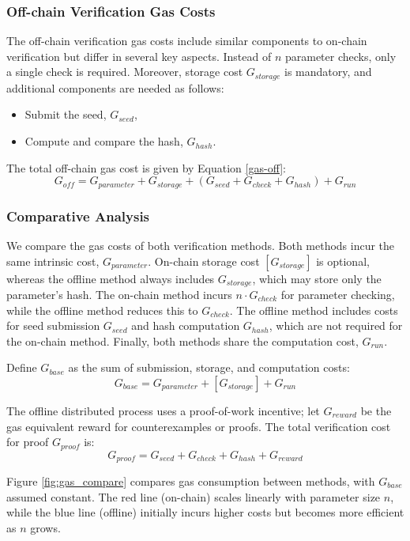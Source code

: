 \documentclass[runningheads]{llncs}
\begin{document}
\subsubsection{Off-chain Verification Gas Costs}
The off-chain verification gas costs include similar components to on-chain verification but differ in several key aspects. Instead of \( n \) parameter checks, only a single check is required. Moreover, storage cost \( G_{storage} \) is mandatory, and additional components are needed as follows:
\begin{itemize}
    \item Submit the seed, \( G_{seed} \),
    \item Compute and compare the hash, \( G_{hash} \).
\end{itemize}
The total off-chain gas cost is given by Equation \ref{gas-off}:
\begin{equation}
\label{gas-off}
G_{off} = G_{parameter} + G_{storage} + (G_{seed} + G_{check} + G_{hash}) + G_{run}
\end{equation}

\subsubsection{Comparative Analysis}
We compare the gas costs of both verification methods.
Both methods incur the same intrinsic cost, \( G_{parameter} \).
On-chain storage cost \( [G_{storage}] \) is optional, whereas the offline method always includes \( G_{storage} \), which may store only the parameter's hash. The on-chain method incurs \( n \cdot G_{check} \) for parameter checking, while the offline method reduces this to \( G_{check} \). The offline method includes costs for seed submission \( G_{seed} \) and hash computation \( G_{hash} \), which are not required for the on-chain method. Finally, both methods share the computation cost, \( G_{run} \).

Define \( G_{base} \) as the sum of submission, storage, and computation costs:
\[
G_{base} = G_{parameter} + [G_{storage}] + G_{run}
\]

The offline distributed process uses a proof-of-work incentive; let \( G_{reward} \) be the gas equivalent reward for counterexamples or proofs. The total verification cost for proof \( G_{proof} \) is:
\[
G_{proof} = G_{seed} + G_{check} + G_{hash} + G_{reward}
\]

Figure \ref{fig:gas_compare} compares gas consumption between methods, with \( G_{base} \) assumed constant. The red line (on-chain) scales linearly with parameter size \( n \), while the blue line (offline) initially incurs higher costs but becomes more efficient as \( n \) grows.
\end{document}
